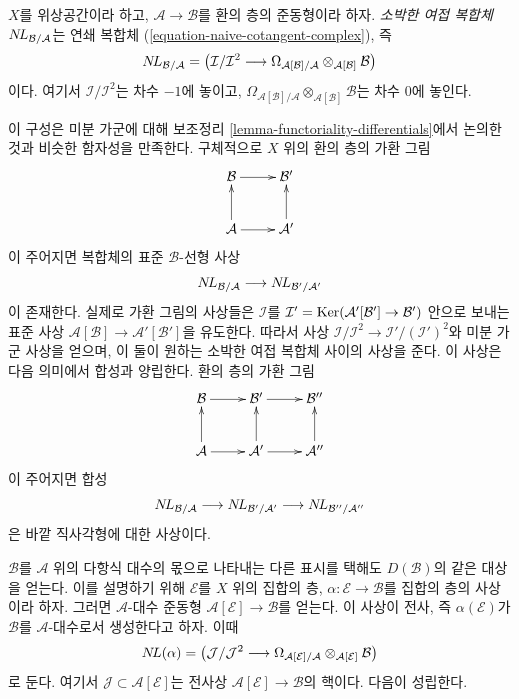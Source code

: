 \begin{definition}
\label{definition-naive-cotangent-complex}
$X$를 위상공간이라 하고, $\mathcal{A} \to \mathcal{B}$를 환의 층의
준동형이라 하자. {\it 소박한 여접 복합체}
$\mathop{N\!L}\nolimits_{\mathcal{B}/\mathcal{A}}$는 연쇄 복합체
(\ref{equation-naive-cotangent-complex}), 즉
$$
\mathop{N\!L}\nolimits_{\mathcal{B}/\mathcal{A}} =
\left(\mathcal{I}/\mathcal{I}^2
\longrightarrow
\Omega_{\mathcal{A}[\mathcal{B}]/\mathcal{A}}
\otimes_{\mathcal{A}[\mathcal{B}]} \mathcal{B}\right)
$$
이다. 여기서 $\mathcal{I}/\mathcal{I}^2$는 차수 $-1$에 놓이고,
$\Omega_{\mathcal{A}[\mathcal{B}]/\mathcal{A}}
\otimes_{\mathcal{A}[\mathcal{B}]} \mathcal{B}$는 차수 $0$에 놓인다.
\end{definition}

\noindent
이 구성은 미분 가군에 대해 보조정리
\ref{lemma-functoriality-differentials}에서 논의한 것과 비슷한
함자성을 만족한다. 구체적으로 $X$ 위의 환의 층의 가환 그림
\begin{equation}
\label{equation-commutative-square-sheaves}
\vcenter{
\xymatrix{
\mathcal{B} \ar[r] & \mathcal{B}' \\
\mathcal{A} \ar[u] \ar[r] & \mathcal{A}' \ar[u]
}
}
\end{equation}
이 주어지면 복합체의 표준 $\mathcal{B}$-선형 사상
$$
\mathop{N\!L}\nolimits_{\mathcal{B}/\mathcal{A}} \longrightarrow \mathop{N\!L}\nolimits_{\mathcal{B}'/\mathcal{A}'}
$$
이 존재한다. 실제로 가환 그림의 사상들은 $\mathcal{I}$를
$\mathcal{I}' = \mathop{\mathrm{Ker}}(\mathcal{A}'[\mathcal{B}'] \to \mathcal{B}')$ 안으로
보내는 표준 사상 $\mathcal{A}[\mathcal{B}] \to \mathcal{A}'[\mathcal{B}']$을
유도한다. 따라서 사상
$\mathcal{I}/\mathcal{I}^2 \to \mathcal{I}'/(\mathcal{I}')^2$와 미분 가군
사상을 얻으며, 이 둘이 원하는 소박한 여접 복합체 사이의 사상을 준다.
이 사상은 다음 의미에서 합성과 양립한다. 환의 층의 가환 그림
$$
\xymatrix{
\mathcal{B} \ar[r] &
\mathcal{B}' \ar[r] &
\mathcal{B}'' \\
\mathcal{A} \ar[u] \ar[r] &
\mathcal{A}' \ar[u] \ar[r] &
\mathcal{A}'' \ar[u]
}
$$
이 주어지면 합성
$$
\mathop{N\!L}\nolimits_{\mathcal{B}/\mathcal{A}} \longrightarrow
\mathop{N\!L}\nolimits_{\mathcal{B}'/\mathcal{A}'} \longrightarrow
\mathop{N\!L}\nolimits_{\mathcal{B}''/\mathcal{A}''}
$$
은 바깥 직사각형에 대한 사상이다.

\medskip\noindent
$\mathcal{B}$를 $\mathcal{A}$ 위의 다항식 대수의 몫으로 나타내는 다른
표시를 택해도 $D(\mathcal{B})$의 같은 대상을 얻는다. 이를 설명하기 위해
$\mathcal{E}$를 $X$ 위의 집합의 층, $\alpha : \mathcal{E} \to \mathcal{B}$를
집합의 층의 사상이라 하자. 그러면 $\mathcal{A}$-대수 준동형
$\mathcal{A}[\mathcal{E}] \to \mathcal{B}$를 얻는다. 이 사상이 전사,
즉 $\alpha(\mathcal{E})$가 $\mathcal{B}$를 $\mathcal{A}$-대수로서
생성한다고 하자. 이때
$$
\mathop{N\!L}\nolimits(\alpha) = \left(
\mathcal{J}/\mathcal{J}^2
\longrightarrow
\Omega_{\mathcal{A}[\mathcal{E}]/\mathcal{A}}
\otimes_{\mathcal{A}[\mathcal{E}]} \mathcal{B}\right)
$$
로 둔다. 여기서 $\mathcal{J} \subset \mathcal{A}[\mathcal{E}]$는 전사상
$\mathcal{A}[\mathcal{E}] \to \mathcal{B}$의 핵이다. 다음이 성립한다.

